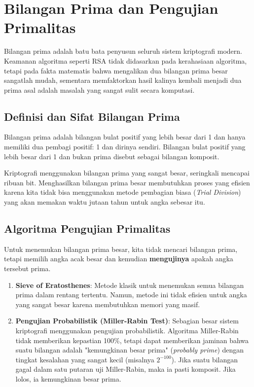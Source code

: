 \section{Bilangan Prima dan Pengujian Primalitas}

Bilangan prima adalah batu bata penyusun seluruh sistem kriptografi modern. Keamanan algoritma seperti RSA tidak didasarkan pada kerahasiaan algoritma, tetapi pada fakta matematis bahwa mengalikan dua bilangan prima besar sangatlah mudah, sementara memfaktorkan hasil kalinya kembali menjadi dua prima asal adalah masalah yang sangat sulit secara komputasi.

\subsection{Definisi dan Sifat Bilangan Prima}

Bilangan prima adalah bilangan bulat positif yang lebih besar dari 1 dan hanya memiliki dua pembagi positif: 1 dan dirinya sendiri. Bilangan bulat positif yang lebih besar dari 1 dan bukan prima disebut sebagai bilangan komposit.

Kriptografi menggunakan bilangan prima yang sangat besar, seringkali mencapai ribuan bit. Menghasilkan bilangan prima besar membutuhkan proses yang efisien karena kita tidak bisa menggunakan metode pembagian biasa (\textit{Trial Division}) yang akan memakan waktu jutaan tahun untuk angka sebesar itu.

\subsection{Algoritma Pengujian Primalitas}

Untuk menemukan bilangan prima besar, kita tidak mencari bilangan prima, tetapi memilih angka acak besar dan kemudian \textbf{mengujinya} apakah angka tersebut prima.

\begin{enumerate}
    \item \textbf{Sieve of Eratosthenes}: Metode klasik untuk menemukan semua bilangan prima dalam rentang tertentu. Namun, metode ini tidak efisien untuk angka yang sangat besar karena membutuhkan memori yang masif.
    \item \textbf{Pengujian Probabilistik (Miller-Rabin Test)}: Sebagian besar sistem kriptografi menggunakan pengujian probabilistik. Algoritma Miller-Rabin tidak memberikan kepastian 100\%, tetapi dapat memberikan jaminan bahwa suatu bilangan adalah "kemungkinan besar prima" (\textit{probably prime}) dengan tingkat kesalahan yang sangat kecil (misalnya $2^{-100}$). Jika suatu bilangan gagal dalam satu putaran uji Miller-Rabin, maka ia pasti komposit. Jika lolos, ia kemungkinan besar prima.
\end{enumerate}


